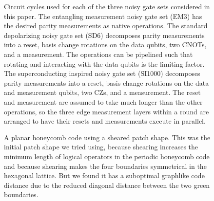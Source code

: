 \documentclass[onecolumn,unpublished,a4paper]{quantumarticle}
\theoremstyle{definition}
\theoremstyle{definition}
\theoremstyle{definition}
\begin{document}
\begin{figure}[h]
    \centering
    \caption{
    Circuit cycles used for each of the three noisy gate sets considered in this paper.
    The entangling measurement noisy gate set (EM3) has the desired parity measurements as native operations.
    The standard depolarizing noisy gate set (SD6) decomposes parity measurements into a reset, basis change rotations on the data qubits, two CNOTs, and a measurement.
    The operations can be pipelined such that rotating and interacting with the data qubits is the limiting factor.
    The superconducting inspired noisy gate set (SI1000) decomposes parity measurements into a reset, basis change rotations on the data and measurement qubits, two CZs, and a measurement.
    The reset and measurement are assumed to take much longer than the other operations, so the three edge measurement layers within a round are arranged to have their resets and measurements execute in parallel.
    }
    \label{fig:circuit_cycles}
\end{figure}

\begin{figure}[h]
    \centering
    \caption{
    A planar honeycomb code using a sheared patch shape.
    This was the initial patch shape we tried using, because shearing increases the minimum length of logical operators \cite{bombin2007optimal} in the periodic honeycomb code and because shearing makes the four boundaries symmetrical in the hexagonal lattice.
    But we found it has a suboptimal graphlike code distance due to the reduced diagonal distance between the two green boundaries.
    }
    \label{fig:sheared}
\end{figure}
\end{document}
